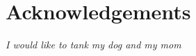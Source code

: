 \chapter*{Acknowledgements}
\label{ack}
\color{blue}
\textit{I would like to tank my dog and my mom}
\color{black}